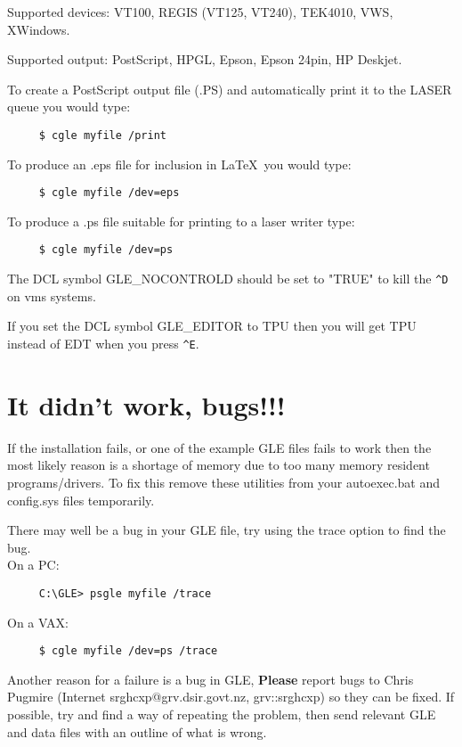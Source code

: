 Supported devices: VT100, REGIS (VT125, VT240), TEK4010, VWS, XWindows.

Supported output: PostScript, HPGL, Epson, Epson 24pin, HP Deskjet.

To create a PostScript output file (.PS) and automatically print it to
the LASER queue you would type:
\begin{verbatim}
     $ cgle myfile /print
\end{verbatim}

To produce an .eps file for inclusion in \LaTeX\ you would type:
\begin{verbatim}
     $ cgle myfile /dev=eps
\end{verbatim}

To produce a .ps file suitable for printing to a laser writer type:
\begin{verbatim}
     $ cgle myfile /dev=ps
\end{verbatim}

The DCL symbol GLE\_NOCONTROLD should be set to "TRUE" to kill the
\verb#^D# on vms systems.

If you set the DCL symbol GLE\_EDITOR to TPU then you will get
TPU instead of EDT when you press \verb#^E#.

\section{It didn't work, bugs!!!}
 
If the installation fails, or one of the example GLE files fails to work
then the most likely reason is a shortage of memory due to too many
memory resident programs/drivers.  To fix this remove these utilities from
your autoexec.bat and config.sys files temporarily.

There may well be a bug in your GLE file,  try using the
trace option to find the bug.\\
On a PC:
\begin{verbatim}
     C:\GLE> psgle myfile /trace
\end{verbatim}

On a VAX:
\begin{verbatim}
     $ cgle myfile /dev=ps /trace
\end{verbatim}

Another reason for a failure is a bug in GLE,  {\bf Please} report
bugs to Chris Pugmire (Internet srghcxp@grv.dsir.govt.nz,  grv::srghcxp)
so they can be fixed. If possible, try and find a way of
repeating the problem, then send relevant GLE and data files with
an outline of what is wrong.

